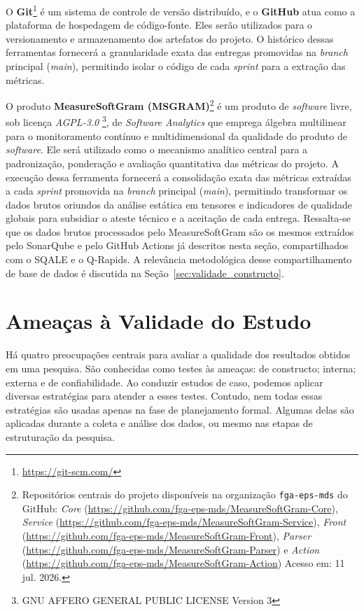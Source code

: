 O \textbf{Git}\footnote{\url{https://git-scm.com/}} é um sistema de controle de versão distribuído, e o \textbf{GitHub} atua como a plataforma de hospedagem de código-fonte. Eles serão utilizados para o versionamento e armazenamento dos artefatos do projeto. O histórico dessas ferramentas fornecerá a granularidade exata das entregas promovidas na \textit{branch} principal (\textit{main}), permitindo isolar o código de cada \textit{sprint} para a extração das métricas.


O produto \textbf{MeasureSoftGram (MSGRAM)}\footnote{Repositórios centrais do projeto disponíveis na organização \texttt{fga-eps-mds} do GitHub: \textit{Core} (\url{https://github.com/fga-eps-mds/MeasureSoftGram-Core}), \textit{Service} (\url{https://github.com/fga-eps-mds/MeasureSoftGram-Service}), \textit{Front} (\url{https://github.com/fga-eps-mds/MeasureSoftGram-Front}), \textit{Parser} (\url{https://github.com/fga-eps-mds/MeasureSoftGram-Parser}) e \textit{Action} (\url{https://github.com/fga-eps-mds/MeasureSoftGram-Action}) Acesso em: 11 jul. 2026.} é um produto de \textit{software} livre, sob licença \textit{AGPL-3.0} \footnote{ GNU AFFERO GENERAL PUBLIC LICENSE Version 3},  de \textit{Software Analytics} que emprega álgebra multilinear para o monitoramento contínuo e multidimensional da qualidade do produto de \textit{software}. Ele será utilizado como o mecanismo analítico central para a padronização, ponderação e avaliação quantitativa das métricas do projeto. A execução dessa ferramenta fornecerá a consolidação exata das métricas extraídas a cada \textit{sprint} promovida na \textit{branch} principal (\textit{main}), permitindo transformar os dados brutos oriundos da análise estática em tensores e indicadores de qualidade globais para subsidiar o ateste técnico e a aceitação de cada entrega. 
Ressalta-se que os dados brutos processados pelo MeasureSoftGram são os mesmos extraídos pelo SonarQube e pelo GitHub Actions já descritos nesta seção, compartilhados com o SQALE e o Q-Rapids. A relevância metodológica desse compartilhamento de base de dados é discutida na Seção~\ref{sec:validade_constructo}.


\section{Ameaças à Validade do Estudo}


Há quatro preocupações centrais para avaliar a qualidade dos resultados obtidos em uma pesquisa. São conhecidas como testes às ameaças: de constructo; interna; externa e de confiabilidade. Ao conduzir estudos de caso, podemos aplicar diversas estratégias para atender a esses testes. Contudo, nem todas essas estratégias são usadas apenas na fase de planejamento formal. Algumas delas são aplicadas durante a coleta e análise dos dados, ou mesmo nas etapas de estruturação da pesquisa. \cite{yin2001estudo}


